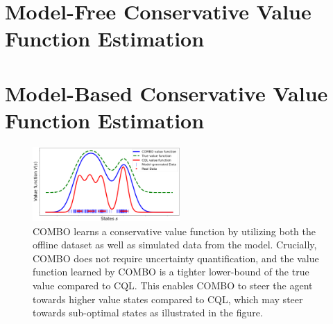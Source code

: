 \documentclass[../thesis.tex]{subfiles}
\begin{document}

\section{Model-Free Conservative Value Function Estimation}


% 





\section{Model-Based Conservative Value Function Estimation}

\begin{figure}[t!]
    \centering
    \includegraphics[width=0.5\textwidth]{chapters/combo/teaser_combo.png}
    \vspace*{-0.5cm}
    \caption{COMBO learns a conservative value function by utilizing both the offline dataset as well as simulated data from the model. Crucially, COMBO does not require uncertainty quantification, and the value function learned by COMBO is a tighter lower-bound of the true value compared to CQL. This enables COMBO to steer the agent towards higher value states compared to CQL, which may steer towards sub-optimal states as illustrated in the figure.}
    \vspace*{-0.6cm}
    \label{fig:combo_teaser}
\end{figure}
\end{document}
